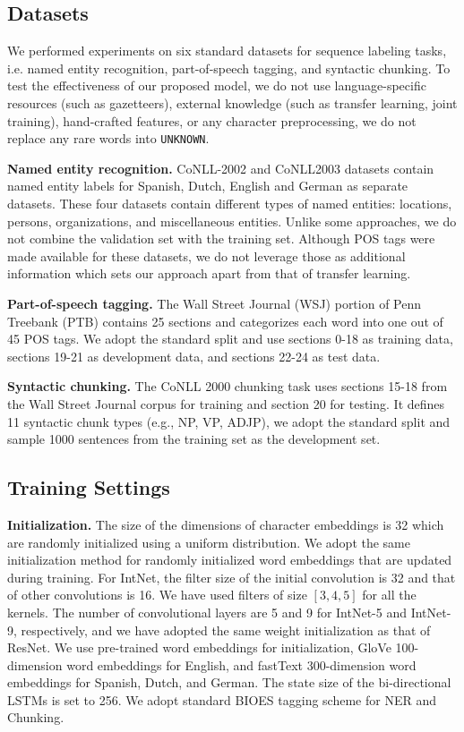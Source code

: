 \documentclass[11pt,a4paper]{article}
\begin{document}
\subsection{Datasets} We performed experiments on six standard datasets for sequence labeling tasks, i.e. named entity recognition, part-of-speech tagging, and syntactic chunking. To test the effectiveness of our proposed model, we do not use language-specific resources (such as gazetteers), external knowledge (such as transfer learning, joint training), hand-crafted features, or any character preprocessing, we do not replace any rare words into {\tt UNKNOWN}.

\textbf{Named entity recognition.} CoNLL-2002 and CoNLL2003 datasets \cite{tksintro2002conll,tjongkimsang2003conll} contain named entity labels for Spanish, Dutch, English and German as separate datasets. These four datasets contain different types of named entities: locations, persons,
organizations, and miscellaneous entities. Unlike some approaches, we do not combine the validation set with the training set. Although POS tags were made available for these datasets, we do not leverage those as additional information which sets our approach apart from that of transfer learning. 

\textbf{Part-of-speech tagging.} The Wall Street Journal (WSJ) portion of Penn Treebank (PTB) \cite{Marcus93buildinga} contains 25 sections and categorizes each word into one out of 45 POS tags. We adopt the standard split and use sections 0-18 as training data, sections 19-21 as development data, and sections 22-24 as test data.

\textbf{Syntactic chunking.} The CoNLL 2000 chunking task \cite{tjong2000introduction} uses sections 15-18 from the Wall Street Journal corpus for training and section 20 for testing. It defines 11 syntactic chunk types (e.g., NP, VP, ADJP), we adopt the standard split and sample 1000 sentences from the training set as the development set.


\subsection{Training Settings}

\textbf{Initialization.} The size of the dimensions of character embeddings is 32 which are randomly initialized using a uniform distribution. We adopt the same initialization method for randomly initialized word embeddings that are updated during training. For IntNet, the filter size of the initial convolution is 32 and that of other convolutions is 16. We have used filters of size $[3, 4, 5]$ for all the kernels. The number of convolutional layers are 5 and 9 for IntNet-5 and IntNet-9, respectively, and we have adopted the same weight initialization as that of ResNet. We use pre-trained word embeddings for initialization, GloVe \cite{pennington2014glove} 100-dimension word embeddings for English, and fastText \cite{bojanowski2017enriching} 300-dimension word embeddings for Spanish, Dutch, and German. The state size of the bi-directional LSTMs is set to 256. We adopt standard BIOES tagging scheme for NER and Chunking.
\end{document}
